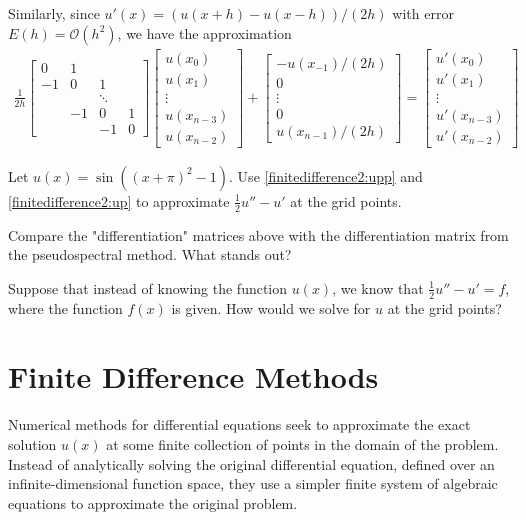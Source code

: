 Similarly, since  $u'(x) = (u(x+h) - u(x-h))/(2h)$ with error $E(h) = \mathcal{O}(h^2)$, we have the approximation 
\begin{align}
\frac{1}{2h}
\begin{bmatrix}
0 & 1 & \\
-1 & 0 & 1  \\
& &\ddots & \\
 & -1 & 0 & 1 \\
 & & -1 & 0
\end{bmatrix}
\begin{bmatrix}
u(x_0) \\ u(x_1)\\ \vdots  \\ u(x_{n-3}) \\ u(x_{n-2})
\end{bmatrix} + 
\begin{bmatrix}
-u(x_{-1})/(2h) \\ 0 \\ \vdots  \\ 0 \\ u(x_{n-1})/(2h)
\end{bmatrix} = 
\begin{bmatrix}
u'(x_0) \\ u'(x_1)\\ \vdots  \\ u'(x_{n-3}) \\ u'(x_{n-2})
\end{bmatrix}\label{finitedifference2:up}
\end{align}

\begin{problem}
	Let $u(x) = \sin((x+\pi)^2-1)$. Use \eqref{finitedifference2:upp} and \eqref{finitedifference2:up} to approximate $\frac{1}{2}u'' - u'$ at the grid points.
	
	Compare the "differentiation" matrices above with the differentiation matrix from the pseudospectral method. What stands out? 
\end{problem}

Suppose that instead of knowing the function $u(x)$, we know that $\frac{1}{2}u'' - u' = f$, where the function $f(x)$ is given. 
How would we solve for $u$ at the grid points?

\section{Finite Difference Methods}

Numerical methods for differential equations seek to approximate the exact solution $u(x)$ at some finite collection of points in the domain of the problem.
Instead of analytically solving the original differential equation, defined over an infinite-dimensional function space, they use a simpler finite system of algebraic equations to approximate the original problem.
 
